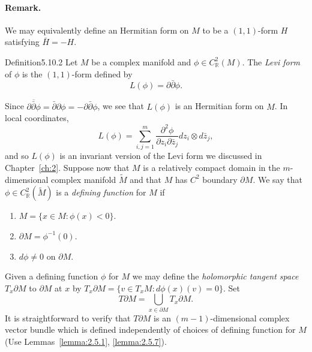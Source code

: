 \paragraph{Remark.} We may equivalently define an Hermitian form on $M$ to be a $(1,1)$-form $H$ satisfying $\bar H=-H$.
\begin{originaltheorem}{Definition}{5.10.2}
Let $M$ be a complex manifold and $\phi\in C_{\mathbb R}^2(M)$. The \emph{Levi form} of $\phi$ is the $(1,1)$-form defined by
\[L(\phi)=\partial\bar\partial\phi.\]
\end{originaltheorem}
Since $\overline{\partial\bar\partial\phi}=\bar\partial\partial\phi=-\partial\bar\partial\phi$, we see that $L(\phi)$ is an Hermitian form on $M$. In local coordinates,
\[L(\phi)=\sum_{i,j=1}^m\frac{\partial^2\phi}{\partial z_i\partial\bar z_j}dz_i\otimes d\bar z_j,\]
and so $L(\phi)$ is an invariant version of the Levi form we discussed in Chapter~\ref{ch:2}.
Suppose now that $M$ is a relatively compact domain in the $m$-dimensional complex manifold $\widetilde M$ and that $M$ has $C^2$ boundary $\partial M$. We say that $\phi\in C_{\mathbb R}^2(\widetilde M)$ is a \emph{defining function} for $M$ if
\begin{enumerate}
\item $M=\{x\in M:\phi(x)<0\}$.
\item $\partial M=\phi^{-1}(0)$.
\item $d\phi\neq0$ on $\partial M$.
\end{enumerate}
Given a defining function $\phi$ for $M$ we may define the \emph{holomorphic tangent space} $T_x\partial M$ to $\partial M$ at $x$ by $T_x\partial M=\{v\in T_xM:d\phi(x)(v)=0\}$. Set
\[T\partial M=\bigcup_{x\in\partial M}T_x\partial M.\]
It is straightforward to verify that $T\partial M$ is an $(m-1)$-dimensional complex vector bundle which is defined independently of choices of defining function for $M$ (Use Lemmas~\ref{lemma:2.5.1}, \ref{lemma:2.5.7}).

